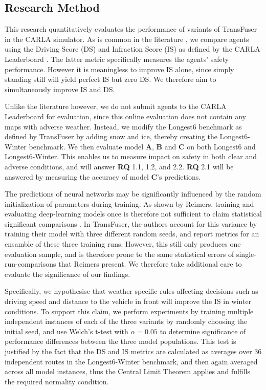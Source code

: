 \subsection*{Research Method}

This research quantitatively evaluates the performance of variants of TransFuser in the CARLA simulator.
As is common in the literature \cite{transfuser:pami, interfuser, pwc:carla},
we compare agents using the
Driving Score (DS) and Infraction Score (IS)
as defined by the CARLA Leaderboard \cite{carla:leaderboard}.
The latter metric specifically measures the agents' safety performance.
However it is meaningless to improve IS alone,
since simply standing still will yield perfect IS but zero DS.
We therefore aim to simultaneously improve IS and DS.

Unlike the literature however,
we do not submit agents to the CARLA Leaderboard for evaluation,
since this online evaluation does not contain any maps with adverse weather.
Instead,
we modify the Longest6 benchmark as defined by TransFuser by adding snow and ice,
thereby creating the Longest6-Winter benchmark.
We then evaluate model \textbf{A}, \textbf{B} and \textbf{C}
on both Longest6 and Longest6-Winter.
This enables us to measure impact on safety in both clear and adverse conditions,
and will answer \textbf{RQ} 1.1, 1.2, and 2.2.
\textbf{RQ} 2.1 will be answered by measuring the accuracy of model \textbf{C}'s predictions.

The predictions of neural networks may be significantly influenced by the random initialization of parameters during training.
As shown by Reimers,
training and evaluating deep-learning models once
is therefore not sufficient to claim statistical significant comparisons \cite{reimers2018comparing}.
In TransFuser,
the authors account for this variance by training their model with three different random seeds,
and report metrics for an ensamble of these three training runs.
However, this still only produces one evaluation sample,
and is therefore prone to the same statistical errors of single-run-comparisons that Reimers present.
We therefore take additional care to evaluate the significance of our findings.

Specifically,
we hypothesise that weather-specific rules affecting decisions such as driving speed and distance to the vehicle in front will improve the IS in winter conditions.
To support this claim,
we perform experiments by training multiple independent instances of each of the three variants by randomly choosing the initial seed,
and use Welch's t-test \cite{wikipedia:welchttest} with $\alpha = 0.05$ to determine significance of performance differences between the three model populations.
This test is justified by the fact that the DS and IS metrics are calculated as averages over 36 independent routes in the Longest6-Winter benchmark,
and then again averaged across all model instances,
thus the Central Limit Theorem \cite{wikipedia:clt} applies and fulfills the required normality condition.

